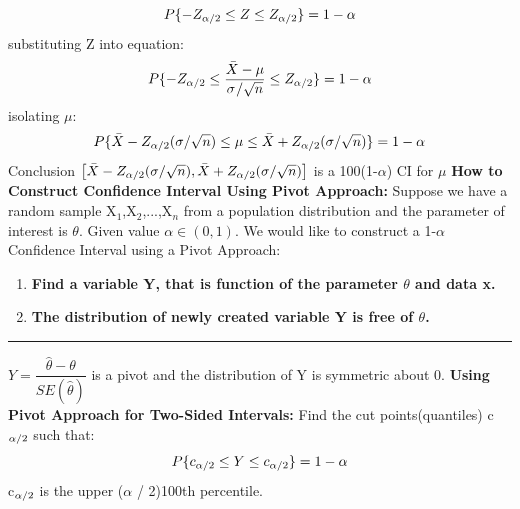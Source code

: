 \documentclass[]{article}
\begin{document}
\[  P \{ -Z_{\alpha\\/2} \le Z \le Z_{\alpha\\/2}  \}  = 1 - \alpha  \] 
\newline substituting Z into equation:
\[  P \{ -Z_{\alpha\\/2} \le \dfrac{\bar{X} - \mu}{\sigma \\/ \sqrt{n} }  \le Z_{\alpha\\/2}  \}  = 1 - \alpha  \] 
\newline isolating $\mu$:
\[  P \{ \bar{X}-Z_{\alpha\\/2} (\sigma \\/ \sqrt{n}) \le \mu \le \bar{X}+Z_{\alpha\\/2} (\sigma \\/ \sqrt{n})  \}   = 1 - \alpha  \] 
\newline Conclusion
$\left[\bar{X} - Z_{\alpha\\/2} (\sigma \\/ \sqrt{n}), \bar{X} + Z_{\alpha\\/2} (\sigma \\/ \sqrt{n}) \right] $ is a 100(1-$\alpha$) CI for $\mu$ 
\newline
\newline\textbf{How to Construct Confidence Interval Using Pivot Approach:} 
\newline Suppose we have a random sample X$_1$,X$_2$,...,X$_n$ from a population distribution and the parameter of interest is $\theta$.
\newline
\newline Given value $\alpha \in (0,1)$. We would like to construct a 1-$\alpha$ Confidence Interval using a Pivot Approach:
\begin{enumerate}
	\item\textbf{Find a variable Y, that is function of the parameter $\theta$ and data x.}
	\item\textbf{The distribution of newly created variable Y is free of $\theta$.}
\end{enumerate}
\newline\Large\rule{3.0cm}{0pt}$Y = \dfrac{\hat{\theta} - \theta}{ SE(\hat{\theta})}$ is a pivot and the distribution of Y is symmetric about 0.
\newline
\newline
\newline\Large\textbf{ Using Pivot Approach for Two-Sided Intervals:}
\newline Find the cut points(quantiles)  c$_{\alpha \\/ 2}$ such that:
\[  P \{ c_{\alpha \\/ 2} \le Y \le c_{\alpha \\/ 2}  \}   = 1 - \alpha  \] 
c$_{\alpha \\/ 2}$ is the upper ($\alpha$ / 2)100th percentile.
 
\section{}
\end{document}
